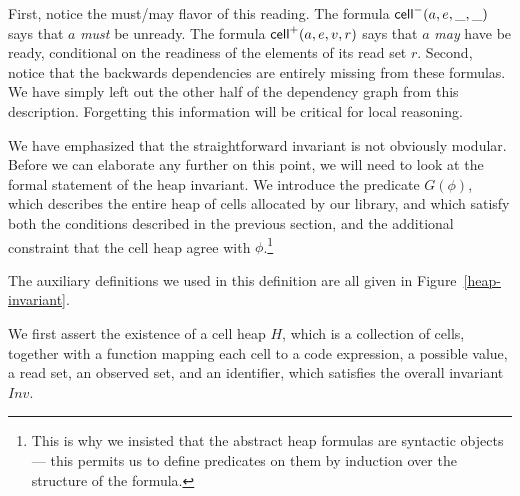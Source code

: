 First, notice the must/may flavor of this reading. The formula
$\mathsf{cell}^{-}({a}, {e}, {\_}, {\_})$ says that $a$ \emph{must} be unready.  The formula
$\mathsf{cell}^{+}({a}, {e}, {v}, {r})$ says that $a$ \emph{may} have be ready,
conditional on the readiness of the elements of its read set
$r$. Second, notice that the backwards dependencies are entirely
missing from these formulas. We have simply left out the other half of
the dependency graph from this description. Forgetting this
information will be critical for local reasoning.

We have emphasized that the straightforward invariant is not obviously
modular. Before we can elaborate any further on this point, we will
need to look at the formal statement of the heap invariant. We
introduce the predicate $G(\phi)$, which describes the entire heap of
cells allocated by our library, and which satisfy both the conditions
described in the previous section, and the additional constraint that
the cell heap agree with $\phi$.\footnote{This is why we insisted that
  the abstract heap formulas are syntactic objects --- this permits us
  to define predicates on them by induction over the structure of the
formula.}



The auxiliary definitions we used in this definition are all given in
Figure~\ref{heap-invariant}. 

We first assert the existence of a cell heap $H$, which is a
collection of cells, together with a function mapping each cell to a
code expression, a possible value, a read set, an observed set, and an
identifier, which satisfies the overall invariant $Inv$.

